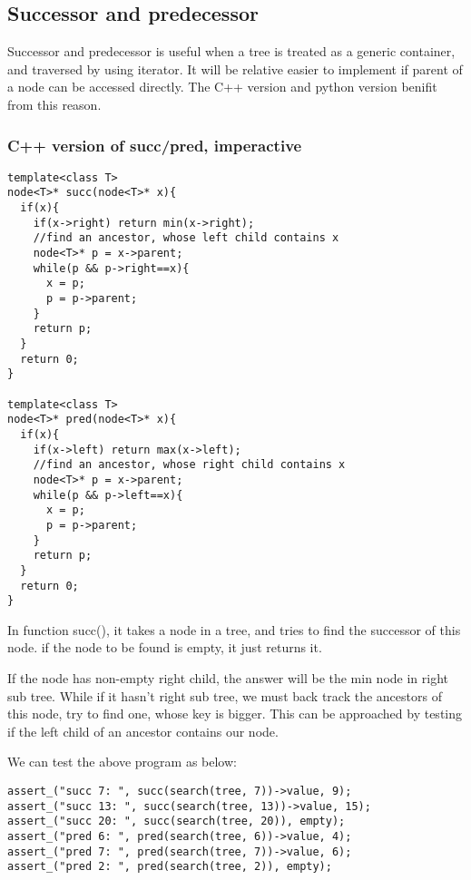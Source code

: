 \documentclass{article}
\begin{document}
\subsection{Successor and predecessor}

Successor and predecessor is useful when a tree is treated as a generic container,
and traversed by using iterator. It will be relative easier to implement if parent of
a node can be accessed directly. The C++ version and python version benifit from
this reason.

\subsubsection*{C++ version of succ/pred, imperactive}

\lstset{language=C++}
\begin{lstlisting}
template<class T>
node<T>* succ(node<T>* x){
  if(x){
    if(x->right) return min(x->right);
    //find an ancestor, whose left child contains x
    node<T>* p = x->parent;
    while(p && p->right==x){
      x = p;
      p = p->parent;
    }
    return p;
  }
  return 0;
}

template<class T>
node<T>* pred(node<T>* x){
  if(x){
    if(x->left) return max(x->left);
    //find an ancestor, whose right child contains x
    node<T>* p = x->parent;
    while(p && p->left==x){
      x = p;
      p = p->parent;
    }
    return p;
  }
  return 0;
}
\end{lstlisting}

In function succ(), it takes a node in a tree, and tries to find the successor
of this node. if the node to be found is empty, it just returns it.

If the node has non-empty right child, the answer will be the min node in right
sub tree. While if it hasn't right sub tree, we must back track the ancestors 
of this node, try to find one, whose key is bigger. This can be approached 
by testing if the left child of an ancestor contains our node.

We can test the above program as below:

\begin{lstlisting}
assert_("succ 7: ", succ(search(tree, 7))->value, 9);
assert_("succ 13: ", succ(search(tree, 13))->value, 15);
assert_("succ 20: ", succ(search(tree, 20)), empty);
assert_("pred 6: ", pred(search(tree, 6))->value, 4);
assert_("pred 7: ", pred(search(tree, 7))->value, 6);
assert_("pred 2: ", pred(search(tree, 2)), empty);
\end{lstlisting}
\end{document}
